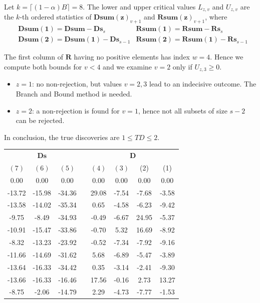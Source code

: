 \documentclass[11pt,a4paper,openright,twoside]{article}
\begin{document}
Let $k=\lceil (1-\alpha) B\rceil =8$. The lower and upper critical values $L_{z,v}$ and $U_{z,v}$ are the $k$-th ordered statistics of $\mathbf{Dsum(z)}_{v+1}$ and $\mathbf{Rsum(z)}_{v+1}$, where
\begin{align*}
& \mathbf{Dsum(1)}=\mathbf{Dsum} - \mathbf{Ds}_{s} & \mathbf{Rsum(1)}=\mathbf{Rsum} - \mathbf{Rs}_{s}\\
& \mathbf{Dsum(2)}=\mathbf{Dsum(1)} - \mathbf{Ds}_{s-1} & \mathbf{Rsum(2)}=\mathbf{Rsum(1)} - \mathbf{Rs}_{s-1}
\end{align*}

The first column of $\mathbf{R}$ having no positive elements has index $w=4$. Hence we compute both bounds for $v<4$ and we examine $v=2$ only if $U_{z,3}\geq 0$.
\begin{itemize}
\item $z=1$: no non-rejection, but values $v=2,3$ lead to an indecisive outcome. The Branch and Bound method is needed.
\item $z=2$: a non-rejection is found for $v=1$, hence not all subsets of size $s-2$ can be rejected.
\end{itemize}
In conclusion, the true discoveries are $1\leq TD\leq 2$.



\newpage
\begin{table}[h!]
\centering
\begin{tabular}{cccccccc}
\multicolumn{3}{c}{$\mathbf{Ds}$} & & \multicolumn{4}{c}{$\mathbf{D}$}\\
$(7)$ & $(6)$ & $(5)$ & & $(4)$ & $(3)$ & (2) & (1) \\
\cline{1-3} \cline{5-8}
0.00 & 0.00 & 0.00 &  & 0.00 & 0.00 & 0.00 & 0.00 \\
-13.72 & -15.98 & -34.36 & & 29.08 & -7.54 & -7.68 & -3.58\\
-13.58 & -14.02 & -35.34 & & 0.65 & -4.58 & -6.23 & -9.42\\
-9.75 & -8.49 & -34.93 & & -0.49 & -6.67 & 24.95 & -5.37\\
-10.91 & -15.47 & -33.86 & & -0.70 & 5.32 & 16.69 & -8.92\\
-8.32 & -13.23 & -23.92 & & -0.52 & -7.34 & -7.92 & -9.16\\
-11.66 & -14.69 & -31.62 & & 5.68 & -6.89 & -5.47 & -3.89\\
-13.64 & -16.33 & -34.42 & & 0.35 & -3.14 & -2.41 & -9.30\\
-13.66 & -16.33 & -16.46 & & 17.56 & -0.16 & 2.73 & 13.27\\
-8.75 & -2.06 & -14.79 & & 2.29 & -4.73 & -7.77 & -1.53
\end{tabular}
\end{table}
\end{document}
